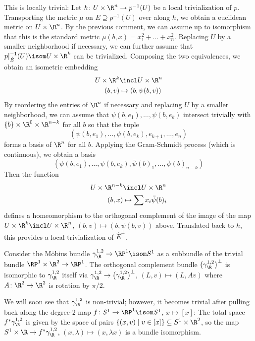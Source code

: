\begin{definition}
\begin{enumerate}[resume]
			This is locally trivial:
			Let $h\colon U \times \R^n \to p^{-1}(U)$ be a local trivialization of $p$. 
			Transporting the metric $\mu$ on $E \supseteq p^{-1}(U)$ over along $h$, we obtain a euclidean metric on $U \times \R^n$.
			By the previous comment, we can assume up to isomorphism that this is the standard metric $\mu(b, x) = x_1^2 + \ldots + x_n^2$.
			Replacing $U$ by a smaller neighborhood if necessary, we can further assume that $p|_{\hat{E}}^{-1}(U) \isom U \times \R^k$ can be trivialized.
			Composing the two equivalences, we obtain an isometric embedding
			\begin{align*}
				U \times \R^k &\incl U \times \R^n \\
				(b, v) &\mapsto (b, \psi(b, v))
			\end{align*}
			By reordering the entries of $\R^n$ if necessary and replacing $U$ by a smaller neighborhood, we can assume that $\psi(b, e_1), \ldots, \psi(b, e_k)$ intersect trivially with $\{b\} \times \R^0 \times \R^{n - k}$ for all $b$ so that the tuple 
			\begin{equation*}
				(\psi(b, e_1), \ldots, \psi(b, e_k), e_{k + 1}, \ldots, e_n)
			\end{equation*}
			forms a basis of $\R^n$ for all $b$.
			Applying the Gram-Schmidt process (which is continuous), we obtain a basis 
			\begin{equation*}
				(\psi(b, e_1), \ldots, \psi(b, e_k), \bar{\psi}(b)_1, \ldots, \bar{\psi}(b)_{n - k})
			\end{equation*}
			Then the function
			\begin{align*}
				U \times \R^{n - k} &\incl U \times \R^n \\
				(b, x) &\mapsto \sum x_i \bar{\psi}(b)_i
			\end{align*}
			defines a homeomorphism to the orthogonal complement of the image of the map $U \times \R^k \incl U \times \R^n$, $(b, v) \mapsto (b, \psi(b, v))$ above.
			Translated back to $h$, this provides a local trivialization of $\hat{E}^\perp$.
	\end{enumerate}
\end{definition}
\begin{example}
	Consider the Möbius bundle $\gamma_{\R}^{1, 2} \to \RP^1 \isom S^1$ as a subbundle of the trivial bundle $\RP^1 \times \R^2 \to \RP^1$.
	The orthogonal complement bundle $\big(\gamma_{\R}^{1, 2}\big)^\perp$ is isomorphic to $\gamma_{\R}^{1, 2}$ itself via $\gamma_{\R}^{1, 2} \to \big(\gamma_{\R}^{1, 2}\big)^\perp$, $(L, v) \mapsto (L, Av)$ where $A\colon \R^2 \to \R^2$ is rotation by $\pi / 2$.

	We will soon see that $\gamma_{\R}^{1, 2}$ is non-trivial; however, it becomes trivial after pulling back along the degree-2 map $f\colon S^1 \to \RP^1 \isom S^1$, $x \mapsto [x]$:
	The total space $f^* \gamma_{\R}^{1, 2}$ is given by the space of pairs $\{(x, v) \mid v \in [x]\} \subseteq S^1 \times \R^2$, so the map $S^1 \times \R \to f^* \gamma_{\R}^{1, 2}$, $(x, \lambda) \mapsto (x, \lambda x)$ is a bundle isomorphism.
\end{example}
